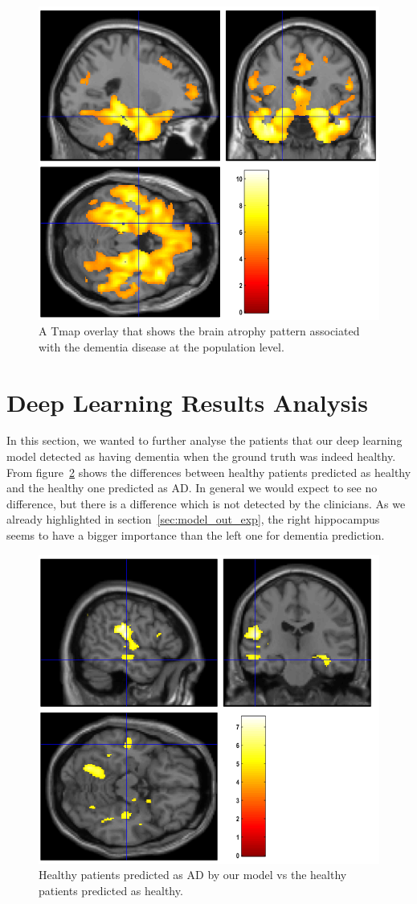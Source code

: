 \begin{figure}
    \centering
    \includegraphics[width=.6\linewidth]{figures/SPM_voxel_analysis.png}
    \caption[width=.6\linewidth]{A Tmap overlay that shows the brain atrophy pattern associated with the dementia disease at the population level.}
    \label{fig:spm_analysis}
\end{figure}

\section{Deep Learning Results Analysis}
\label{sec:ml_result_stat_analysis}

In this section, we wanted to further analyse the patients that our deep learning model detected as having dementia when the ground truth was indeed healthy. From figure~\ref{fig:spm_ml_analysis} shows the differences between healthy patients predicted as healthy and the healthy one predicted as AD. In general we would expect to see no difference, but there is a difference which is not detected by the clinicians. As we already highlighted in section~\ref{sec:model_out_exp}, the right hippocampus seems to have a bigger importance than the left one for dementia prediction.

\begin{figure}
    \centering
    \includegraphics[width=.6\linewidth]{figures/spm_ml_output_analysis.png}
    \caption[width=.6\linewidth]{Healthy patients predicted as AD by our model vs the healthy patients predicted as healthy.}
    \label{fig:spm_ml_analysis}
\end{figure}